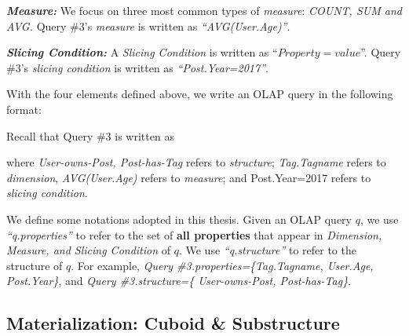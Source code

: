 \noindent\textbf{\textit{Measure:}} We focus on three most common types of \textit{measure}: \textit{COUNT, SUM and AVG. } Query \#3's \textit{measure} is written as \textit{``AVG(User.Age)''}.


\noindent\textbf{\textit{Slicing Condition:}} A \textit{Slicing Condition} is written as ``$Property = value$''. Query \#3's \textit{slicing condition} is written as \textit{``Post.Year=2017''}.

\noindent With the four elements defined above, we write an OLAP query in the following format:


\noindent Recall that Query \#3 is written as 


\noindent where \textit{User-owns-Post, Post-has-Tag} refers to  \textit{structure}; \textit{Tag.Tagname} refers to \textit{dimension},\textit{ AVG(User.Age) } refers to \textit{measure}; and {Post.Year=2017} refers to \textit{slicing condition}. 



\par
We define some notations adopted in this thesis. Given an OLAP query $q$, we use \textit{``q.properties''} to refer to the set of \textbf{all properties} that appear in \textit{Dimension, Measure, and Slicing Condition} of $q$. We use \textit{``q.structure''} to refer to the structure of $q$. For example, \textit{Query \#3.properties=\{Tag.Tagname, User.Age, Post.Year\}}, and \textit{Query \#3.structure=\{ User-owns-Post, Post-has-Tag\}}.



\subsection{Materialization: Cuboid \& Substructure}
\label{Materialization: Cuboid vs Substructures}



